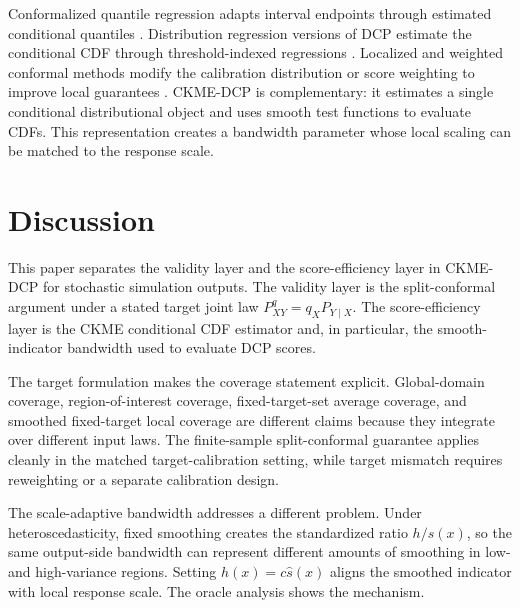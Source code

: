 \documentclass[11pt]{article}
\newif\ifincludeexperiments
\begin{document}
Conformalized quantile regression adapts interval endpoints through estimated conditional quantiles \cite{romano2019}. Distribution regression versions of DCP estimate the conditional CDF through threshold-indexed regressions \cite{chernozhukov2021}. Localized and weighted conformal methods modify the calibration distribution or score weighting to improve local guarantees \cite{tibshirani2019,hore2025}. CKME-DCP is complementary: it estimates a single conditional distributional object and uses smooth test functions to evaluate CDFs. This representation creates a bandwidth parameter whose local scaling can be matched to the response scale.

\section{Discussion}
\label{sec:discussion}

This paper separates the validity layer and the score-efficiency layer in CKME-DCP for stochastic simulation outputs. The validity layer is the split-conformal argument under a stated target joint law \(P^q_{XY}=q_XP_{Y\mid X}\). The score-efficiency layer is the CKME conditional CDF estimator and, in particular, the smooth-indicator bandwidth used to evaluate DCP scores.

The target formulation makes the coverage statement explicit. Global-domain coverage, region-of-interest coverage, fixed-target-set average coverage, and smoothed fixed-target local coverage are different claims because they integrate over different input laws. The finite-sample split-conformal guarantee applies cleanly in the matched target-calibration setting, while target mismatch requires reweighting or a separate calibration design.

The scale-adaptive bandwidth addresses a different problem. Under heteroscedasticity, fixed smoothing creates the standardized ratio \(h/s(x)\), so the same output-side bandwidth can represent different amounts of smoothing in low- and high-variance regions. Setting \(h(x)=c\widehat s(x)\) aligns the smoothed indicator with local response scale. The oracle analysis shows the mechanism.

\ifincludeexperiments
The present experiments focus on calibrated score-set and projected-interval performance rather than raw CDF estimation alone. Raw CDF and score diagnostics are useful for mechanism checks, but raw score-set coverage, projected-interval coverage, width, interval score, and groupwise stability must remain distinct. The numerical evidence supports oracle scale normalization as a mechanism on the two raised-floor models and shows that the implementable estimator increasingly tracks their scale patterns. Its downstream interval and groupwise effects remain DGP-dependent, especially for M/M/1. Region-of-interest targets, projection-aware interval construction, fair scalar-multiplier selection, a null-calibrated score diagnostic, and refreshed external conformal or simulation-UQ baselines are necessary next steps before a journal-level performance claim.
\fi
\end{document}
